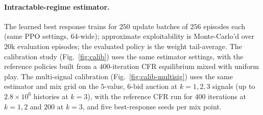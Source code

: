 \documentclass[11pt,a4paper]{article}
\begin{document}
\paragraph{Intractable-regime estimator.} The learned best response trains for $250$
update batches of $256$ episodes each (same PPO settings, $64$-wide); approximate
exploitability is Monte-Carlo'd over $20$k evaluation episodes; the evaluated policy is
the weight tail-average. The calibration study (Fig.~\ref{fig:calib}) uses the same
estimator settings, with the reference policies built from a $400$-iteration CFR
equilibrium mixed with uniform play. The multi-signal calibration
(Fig.~\ref{fig:calib-multisig}) uses the same estimator and mix grid on the $5$-value,
$6$-bid auction at $k=1,2,3$ signals (up to $2.8\times10^{6}$ histories at $k=3$), with
the reference CFR run for $400$ iterations at $k{=}1,2$ and $200$ at $k=3$, and five
best-response seeds per mix point.



\end{document}
